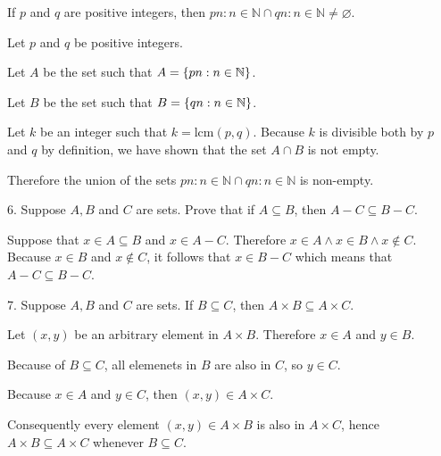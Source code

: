 \documentclass[openany, 12pt]{book}
\begin{document}
\begin{exercise}{}{}
	If $p$ and $q$ are positive integers, then ${p n: n \in \mathbb{N}} \cap{q
			n: n \in \mathbb{N}} \neq \varnothing$.
	\begin{alist}
		\item Let $p$ and $q$ be positive integers.
		\item Let $A$ be the set such that $A=\{pn:n\in\mathbb{N}\}$.
		\item Let $B$ be the set such that $B=\{qn:n\in\mathbb{N}\}$.
		\item Let $k$ be an integer such that $k=\text{lcm}(p, q)$. Because $k$ is
		divisible both by $p$ and $q$ by definition, we have shown that the set $A
			\cap B$ is not empty.
		\item Therefore the union of the sets
		${p n: n \in \mathbb{N}} \cap{q n: n \in \mathbb{N}}$ is non-empty.
	\end{alist}
\end{exercise}

\begin{exercise}{}{}
	{6. Suppose $A, B$ and $C$ are sets. Prove that if $A \subseteq B$, then $A-C \subseteq B-C$.}
	\begin{alist}
		\item
		Suppose that $x\in A\subseteq B$ and $x\in A-C$. Therefore $x\in A\land x\in B
			\land x \notin C$. Because $x\in B$ and $x\notin C$, it follows that $x\in B-C$
		which means that $A-C\subseteq B-C$.
	\end{alist}
\end{exercise}

\begin{exercise}{}{}
	{7. Suppose $A, B$ and $C$ are sets. If $B \subseteq C$, then $A \times B \subseteq A \times C$.}
	\begin{alist}
		\item Let $(x, y)$ be an arbitrary element in $A\times B$. Therefore $x\in A$
		and $y\in B$.
		\item Because of $B\subseteq C$, all elemenets in $B$ are also in $C$, so $y\in C$.
		\item Because $x\in A$ and $y\in C$, then $(x, y) \in A \times C$.
		\item Consequently every element $(x, y) \in A\times B$ is also in $A\times C$,
		hence $A \times B \subseteq A \times C$ whenever $B\subseteq C$.
	\end{alist}
\end{exercise}
\end{document}
